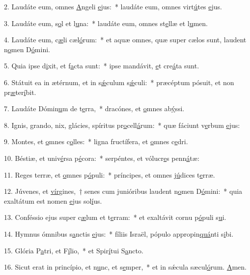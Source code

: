 2. Laudáte eum, omnes \uline{A}ngeli \uline{e}jus:~* laudáte eum, omnes virt\uline{ú}tes \uline{e}jus.\par 
3. Laudáte eum, s\uline{o}l et l\uline{u}na:~* laudáte eum, omnes st\uline{e}llæ et l\uline{u}men.\par 
4. Laudáte eum, c\uline{æ}li cæl\uline{ó}rum:~* et aquæ omnes, quæ super cælos sunt, laudent n\uline{o}men D\uline{ó}mini.\par 
5. Quia ipse d\uline{i}xit, et f\uline{a}cta sunt:~* ipse mandávit, \uline{e}t cre\uline{á}ta sunt.\par 
6. Státuit ea in ætérnum, et in s\uline{ǽ}culum s\uline{ǽ}culi:~* præcéptum pósuit, et non pr\uline{æ}ter\uline{í}bit.\par 
7. Laudáte Dómin\uline{u}m de t\uline{e}rra,~* dracónes, et \uline{o}mnes ab\uline{ý}ssi.\par 
8. Ignis, grando, nix, glácies, spíritus pr\uline{o}cell\uline{á}rum:~* quæ fáciunt v\uline{e}rbum \uline{e}jus:\par 
9. Montes, et \uline{o}mnes c\uline{o}lles:~* ligna fructífera, et \uline{o}mnes c\uline{e}dri.\par 
10. Béstiæ, et univ\uline{é}rsa p\uline{é}cora:~* serpéntes, et vólucr\uline{e}s penn\uline{á}tæ:\par 
11. Reges terræ, et \uline{o}mnes p\uline{ó}puli:~* príncipes, et omnes j\uline{ú}dices t\uline{e}rræ.\par 
12. Júvenes, et \uline{vír}gines,~† senes cum junióribus laudent n\uline{o}men D\uline{ó}mini:~* quia exaltátum est nomen \uline{e}jus sol\uline{í}us.\par 
13. Conféssio ejus super c\uline{æ}lum et t\uline{e}rram:~* et exaltávit cornu p\uline{ó}puli s\uline{u}i.\par 
14. Hymnus ómnibus s\uline{a}nctis \uline{e}jus:~* fíliis Israël, pópulo appropin\uline{quá}nti s\uline{i}bi.\par 
15. Glória P\uline{a}tri, et F\uline{í}lio,~* et Spir\uline{í}tui S\uline{a}ncto.\par 
16. Sicut erat in princípio, et n\uline{u}nc, et s\uline{e}mper,~* et in sǽcula sæcul\uline{ó}rum. \uline{A}men.\par 
